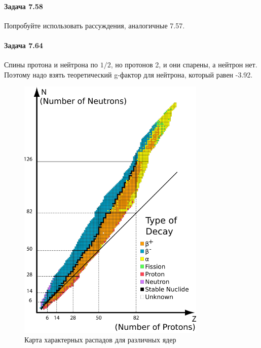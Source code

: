 \documentclass[12pt]{article}
\begin{document}
\paragraph{Задача 7.58} Попробуйте использовать рассуждения, аналогичные 7.57.
\paragraph{Задача 7.64} Спины протона и нейтрона по $1/2$, но протонов 2, и они спарены, а нейтрон нет. Поэтому надо взять теоретический g-фактор для нейтрона, который равен -3.92.

\begin{figure}[h]
    \centering
    \includegraphics[width=0.8\textwidth,height=\textheight,keepaspectratio]{Seminar_09/pics/pic_table_isotopes.png}
    \caption{Карта характерных распадов для различных ядер}
    \label{fig:sem_09_isotopes}
\end{figure}
\end{document}
